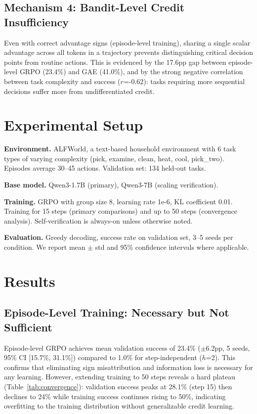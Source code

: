 \documentclass{article}
\begin{document}
\subsection{Mechanism 4: Bandit-Level Credit Insufficiency}

Even with correct advantage signs (episode-level training), sharing a single scalar advantage across all tokens in a trajectory prevents distinguishing critical decision points from routine actions. This is evidenced by the 17.6pp gap between episode-level GRPO (23.4\%) and GAE (41.0\%), and by the strong negative correlation between task complexity and success ($r$=-0.62): tasks requiring more sequential decisions suffer more from undifferentiated credit.

\section{Experimental Setup}

\textbf{Environment.} ALFWorld, a text-based household environment with 6 task types of varying complexity (pick, examine, clean, heat, cool, pick\_two). Episodes average 30--45 actions. Validation set: 134 held-out tasks.

\textbf{Base model.} Qwen3-1.7B (primary), Qwen3-7B (scaling verification).

\textbf{Training.} GRPO with group size 8, learning rate 1e-6, KL coefficient 0.01. Training for 15 steps (primary comparisons) and up to 50 steps (convergence analysis). Self-verification is always-on unless otherwise noted.

\textbf{Evaluation.} Greedy decoding, success rate on validation set, 3--5 seeds per condition. We report mean $\pm$ std and 95\% confidence intervals where applicable.

\section{Results}

\subsection{Episode-Level Training: Necessary but Not Sufficient}

Episode-level GRPO achieves mean validation success of 23.4\% ($\pm$6.2pp, 5 seeds, 95\% CI [15.7\%, 31.1\%]) compared to 1.0\% for step-independent ($h$=2). This confirms that eliminating sign misattribution and information loss is necessary for any learning. However, extending training to 50 steps reveals a hard plateau (Table~\ref{tab:convergence}): validation success peaks at 28.1\% (step 15) then declines to 24\% while training success continues rising to 50\%, indicating overfitting to the training distribution without generalizable credit learning.
\end{document}
